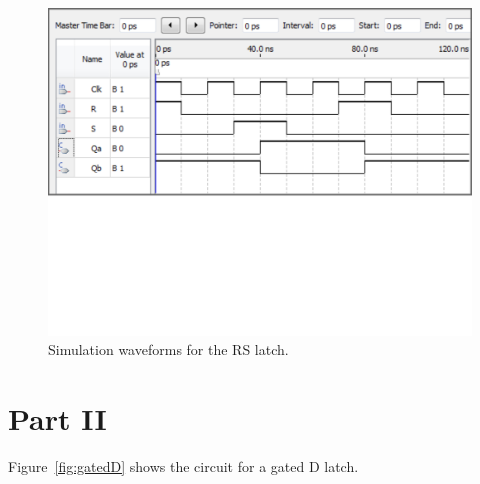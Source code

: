 \documentclass[epsfig,10pt,fullpage]{article}
\begin{document}
\begin{figure}[H]
	\begin{center}
		\includegraphics[width = 5in]{figures/simulation.pdf}
	\end{center}
	\caption{Simulation waveforms for the RS latch.}
\label{fig:sim}
\end{figure}

\section*{Part II}
Figure~\ref{fig:gatedD} shows the circuit for a gated D latch.
\end{document}
